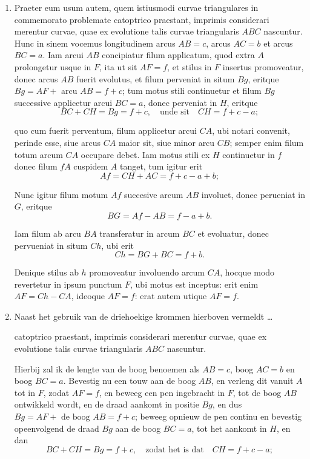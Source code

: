 \documentclass[10pt,a4paper]{article}
\newcommand{\switchenum}{\setcounter{enumi}{\arabic{enumi}-1}\switchcolumn}
\begin{document}
\begin{paracol}{2}
\begin{enumerate}[topsep=1px]
		\switchcolumn*
		
		\item Praeter eum usum autem, quem istiusmodi curvae triangulares in commemorato problemate catoptrico praestant, imprimis considerari merentur curvae, quae ex evolutione talis curvae triangularis $A B C$ nascuntur. Hunc in sinem vocemus longitudinem arcus $A B = c$, arcus $AC=b$ et arcus $BC=a$. Iam arcui $AB$ concipiatur filum applicatum, quod extra $A$ prolongetur usque in $F$, ita ut sit $AF=f$, et stilus in $F$ insertus promoveatur, donec arcus $AB$ fuerit evolutus, et filum perveniat in situm $Bg$, eritque $Bg = AF +$ arcu $AB = f+c$; tum motus stili continuetur et filum $Bg$ successive applicetur arcui $BC=a$, donec perveniat in $H$, eritque 
		\[
			BC+CH = Bg = f+c, \quad \text{unde sit} \quad CH = f+c-a;
		\]
		\par quo cum fuerit perventum, filum applicetur arcui $CA$, ubi notari convenit, perinde esse, siue arcus $CA$ maior sit, siue minor arcu $CB$; semper enim filum totum arcum $CA$ occupare debet. Iam motus stili ex $H$ continuetur in $f$ donec filum $fA$ cuspidem $A$ tanget, tum igitur erit 
		\[
			Af = CH + AC = f+c-a+b;
		\]
		\par Nunc igitur filum motum $Af$ succesive arcum $AB$ involuet, donec perueniat in $G$, eritque
		\[
			BG = Af - AB = f-a+b.
		\]
		\par Iam filum ab arcu $BA$ transferatur in arcum $BC$ et evoluatur, donec pervueniat in situm $Ch$, ubi erit
		\[
			Ch = BG + BC = f+b.
		\]
		\par Denique stilus ab $h$ promoveatur involuendo arcum $CA$, hocque modo revertetur in ipsum punctum $F$, ubi motus est inceptus: erit enim $AF = Ch-CA$, ideoque $AF=f$: erat autem utique $AF =f$.
		
		\switchenum
		\item Naast het gebruik van de driehoekige krommen hierboven vermeldt \ldots 
		\par catoptrico praestant, imprimis considerari merentur curvae, quae ex evolutione talis curvae triangularis $A B C$ nascuntur. 
		\par Hierbij zal ik de lengte van de boog benoemen als $AB = c$, boog $AC=b$ en boog $BC=a$. Bevestig nu een touw aan de boog $AB$, en verleng dit vanuit $A$ tot in $F$, zodat $AF=f$, en beweeg een pen ingebracht in $F$, tot de boog $AB$ ontwikkeld wordt, en de draad aankomt in positie $Bg$, en dus $Bg = AF + \text{ de boog } AB = f+c$; beweeg opnieuw de pen continu en bevestig opeenvolgend de draad $Bg$ aan de boog $BC=a$, tot het aankomt in $H$, en dan
		\[
			BC+CH = Bg = f+c, \quad \text{zodat het is dat} \quad CH = f+c-a;
		\]



\end{enumerate}
\end{paracol}
\end{document}
